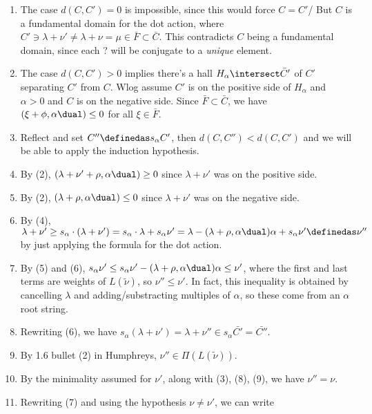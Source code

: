 \begin{description}
\begin{enumerate}
\def\labelenumi{\arabic{enumi}.}
\tightlist
\item
  The case \(d(C, C') = 0\) is impossible, since this would force
  \(C =C'\)/ But \(C\) is a fundamental domain for the dot action, where
  \(C' \ni \lambda + \nu' \neq \lambda + \nu = \mu \in \bar F \subset \bar C\).
  This contradicts \(C\) being a fundamental domain, since each ? will
  be conjugate to a \emph{unique} element.
\item
  The case \(d(C, C') > 0\) implies there's a hall
  \(H_\alpha \intersect \bar C '\) of \(C'\) separating \(C'\) from
  \(C\). Wlog assume \(C'\) is on the positive side of \(H_\alpha\) and
  \(\alpha > 0\) and \(C\) is on the negative side. Since
  \(\bar F \subset \bar C\), we have
  \((\xi + \phi, \alpha\dual) \leq 0\) for all \(\xi \in \bar F\).
\item
  Reflect and set \(C'' \definedas s_\alpha C'\), then
  \(d(C, C'') < d(C, C')\) and we will be able to apply the induction
  hypothesis.
\item
  By (2), \((\lambda + \nu' + \rho, \alpha\dual) \geq 0\) since
  \(\lambda + \nu'\) was on the positive side.
\item
  By (2), \((\lambda + \rho, \alpha\dual) \leq 0\) since
  \(\lambda + \nu'\) was on the negative side.
\item
  By (4),
  \(\lambda + \nu' \geq s_\alpha \cdot (\lambda + \nu') = s_\alpha \cdot \lambda + s_\alpha \nu' = \lambda - (\lambda + \rho, \alpha\dual)\alpha + s_\alpha \nu' \definedas \nu''\)
  by just applying the formula for the dot action.
\item
  By (5) and (6),
  \(s_\alpha \nu' \leq s_\alpha \nu' - (\lambda + \rho, \alpha\dual) \alpha \leq \nu'\),
  where the first and last terms are weights of \(L(\tilde \nu)\), so
  \(\nu'' \leq \nu'\). In fact, this inequality is obtained by
  cancelling \(\lambda\) and adding/substracting multiples of
  \(\alpha\), so these come from an \(\alpha\) root string.
\item
  Rewriting (6), we have
  \(s_\alpha (\lambda + \nu') = \lambda + \nu'' \in s_\alpha \bar {C'} = \bar {C''}\).
\item
  By 1.6 bullet (2) in Humphreys, \(\nu'' \in \Pi (L(\tilde \nu))\).
\item
  By the minimality assumed for \(\nu'\), along with (3), (8), (9), we
  have \(\nu'' = \nu\).
\item
  Rewriting (7) and using the hypothesis \(\nu \neq \nu'\), we can write

\end{enumerate}
\end{description}
